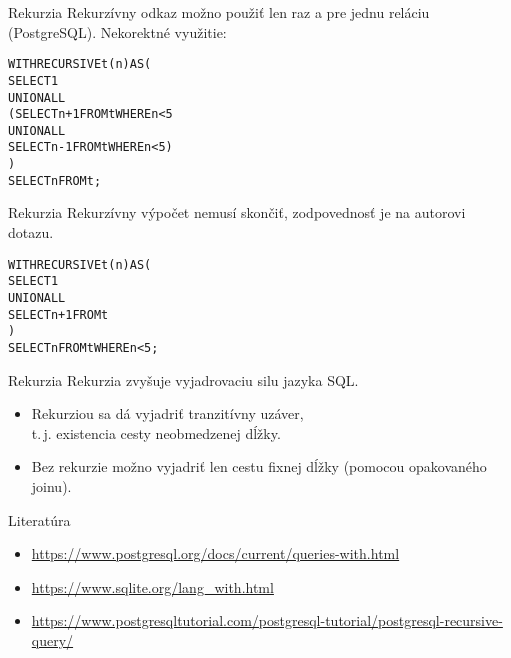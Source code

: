 \documentclass[12pt]{beamer}
\def\blue#1{\textcolor{Cerulean}{#1}}
\begin{document}
\begin{frame}[fragile]{Rekurzia}
Rekurzívny odkaz možno použiť len raz a pre jednu reláciu (PostgreSQL).
\alert{Nekorektné} využitie:
\begin{alltt}
WITH RECURSIVE t(n) AS (
    SELECT 1
  UNION ALL
    (SELECT n+1 FROM \blue{t} WHERE n < 5
        UNION ALL
     SELECT n-1 FROM \blue{t} WHERE n < 5)
)
SELECT n FROM t;
\end{alltt}
\end{frame}

\begin{frame}[fragile]{Rekurzia}
Rekurzívny výpočet nemusí skončiť, zodpovednosť je na autorovi dotazu.
\bigskip

\begin{alltt}
WITH RECURSIVE t(n) AS (
    SELECT 1
  UNION ALL
    SELECT n+1 FROM t
)
SELECT n FROM t WHERE n < 5;
\end{alltt}
\end{frame}

\begin{frame}[fragile]{Rekurzia}
Rekurzia zvyšuje vyjadrovaciu silu jazyka SQL.
\begin{itemize}
\item Rekurziou sa dá vyjadriť \blue{tranzitívny uzáver},\\ t.\,j. existencia cesty neobmedzenej dĺžky.
\item Bez rekurzie možno vyjadriť len cestu fixnej dĺžky (pomocou opakovaného joinu).
\end{itemize}
\end{frame}


\begin{frame}{Literatúra}
\begin{itemize}
\item {\scriptsize\url{https://www.postgresql.org/docs/current/queries-with.html}}
\item {\scriptsize\url{https://www.sqlite.org/lang_with.html}}
\item {\scriptsize\url{https://www.postgresqltutorial.com/postgresql-tutorial/postgresql-recursive-query/}}
\end{itemize}
\end{frame}
\end{document}
